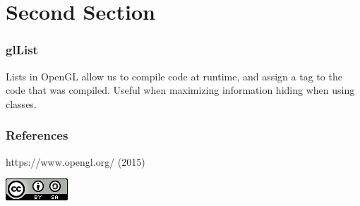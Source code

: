 \documentclass{beamer}
\begin{document}
          \section{Second Section}
          \begin{frame}
            \frametitle{glList}
            Lists in OpenGL allow us to compile code at runtime, and assign a tag to the code that was compiled. Useful when maximizing information hiding when using classes.
          \end{frame}

          \begin{frame}
            \frametitle{References}
            \footnotesize {
              \begin{thebibliography}{99}
               https://www.opengl.org/ (2015)
              \end{thebibliography}
            }
            \includegraphics[scale=.33]{../cc.png}

          \end{frame}

          
\end{document}

